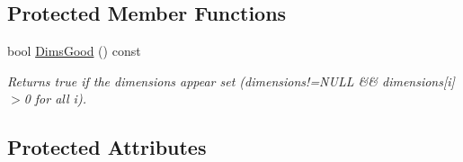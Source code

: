 \subsection*{Protected Member Functions}
\begin{DoxyCompactItemize}
\item 
bool \hyperlink{classJKBuilder_1_1tensor_a6e72344440b411f433eb50171648c2d0}{DimsGood} () const 
\begin{DoxyCompactList}\small\item\em Returns true if the dimensions appear set (dimensions!=NULL \&\& dimensions\mbox{[}i\mbox{]}$>$0 for all i). \item\end{DoxyCompactList}\end{DoxyCompactItemize}
\subsection*{Protected Attributes}

